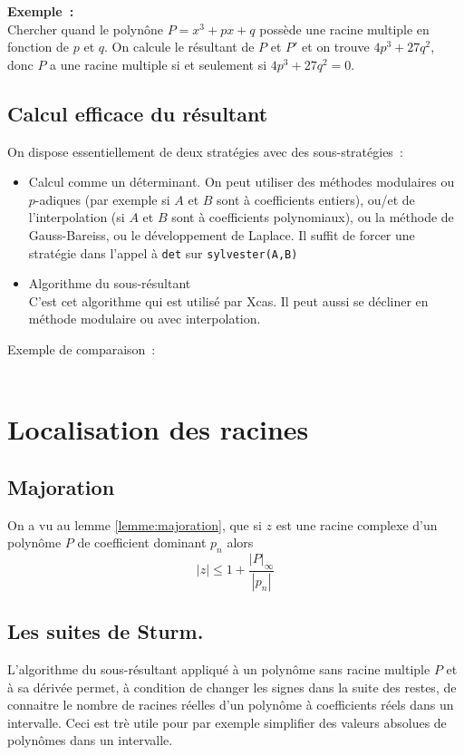 \documentclass[a4paper,11pt]{article}
\begin{document}
\begin{giacjshere}
{\bf Exemple~:}\\ 
Chercher quand le polyn\^one $P=x^3+px+q$ poss\`ede
une racine multiple en fonction de $p$ et $q$. On calcule le
r\'esultant de $P$ et $P'$ et on trouve $4p^3+27q^2$, donc $P$
a une racine multiple si et seulement si $4p^3+27q^2=0$.

\subsection{Calcul efficace du r\'esultant}
On dispose essentiellement de deux strat\'egies avec des sous-strat\'egies~:
\begin{itemize}
\item Calcul comme un d\'eterminant.
On peut utiliser des m\'ethodes modulaires ou $p$-adiques (par exemple
si $A$ et $B$ sont \`a coefficients entiers), ou/et de l'interpolation
(si $A$ et $B$ sont \`a coefficients polynomiaux), ou la m\'ethode
de Gauss-Bareiss, ou le d\'eveloppement de Laplace. Il suffit
de forcer une strat\'egie dans l'appel \`a \verb|det| sur
\verb|sylvester(A,B)|
\item Algorithme du sous-r\'esultant\\
C'est cet algorithme qui est utilis\'e par Xcas.
Il peut aussi se d\'ecliner en m\'ethode modulaire ou avec interpolation.
\end{itemize}
Exemple de comparaison~:\\
\\

\section{Localisation des racines} \label{sec:racines}
\subsection{Majoration}
On a vu au lemme \ref{lemme:majoration}, 
que si $z$ est une racine complexe d'un polyn\^ome $P$ 
de coefficient dominant $p_n$ alors
$$ |z| \leq 1 + \frac{|P|_\infty}{|p_n|}$$ 

\subsection{Les suites de Sturm.}
L'algorithme du sous-r\'esultant appliqu\'e \`a un polyn\^ome sans
racine multiple $P$ et \`a sa d\'eriv\'ee
permet, \`a condition de changer les signes dans la suite des restes, 
de connaitre le nombre de racines r\'eelles d'un polyn\^ome 
\`a coefficients r\'eels dans un 
intervalle. Ceci est tr\`e utile pour par exemple simplifier des valeurs
absolues de polyn\^omes dans un intervalle.


\end{giacjshere}
\end{document}
